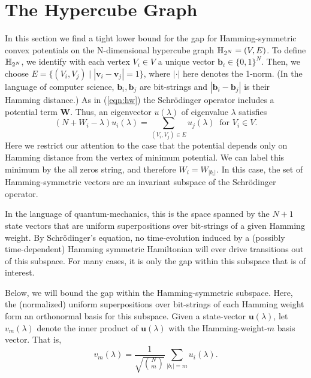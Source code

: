     \section{The Hypercube Graph}
    In this section we find a tight lower bound for the gap for Hamming-symmetric convex potentials on the N-dimensional hypercube graph $\mathbb{H}_{2^N} = (V,E)$. To define $\mathbb{H}_{2^N}$, we identify with each vertex $V_i \in V$ a unique vector $\mathbf{b}_i \in \{0,1\}^N$. Then, we choose $E = \{(V_i,V_j)\; \big\rvert \;|\mathbf{v}_i-\mathbf{v}_j| = 1 \}$, where $|\cdot|$ here denotes the 1-norm. (In the language of computer science, $\mathbf{b}_i, \mathbf{b}_j$ are bit-strings and $|\mathbf{b}_i - \mathbf{b}_j|$ is their Hamming distance.) As in (\ref{eqn:hw}) the Schr\"{o}dinger operator includes a potential term $\mathbf{W}$. Thus, an eigenvector $u(\lambda)$ of eigenvalue $\lambda$ satisfies
    \begin{equation}\label{eqn:recurrence_hyper_prior}
    	(N + W_i - \lambda)u_i(\lambda) = \sum_{(V_i,V_j)\in E} u_j(\lambda) \;\; \text{for $V_i \in V$.}
    \end{equation}
    Here we restrict our attention to the case that the potential depends only on Hamming distance from the vertex of minimum potential. We can label this minimum by the all zeros string, and therefore $W_i = W_{|b_i|}$. In this case, the set of Hamming-symmetric vectors are an invariant subspace of the Schr\"{o}dinger operator.
    \begin{remark}
    In the language of quantum-mechanics, this is the space spanned by the $N+1$ state vectors that are uniform superpositions over bit-strings of a given Hamming weight. By Schr{\"o}dinger's equation, no time-evolution induced by a (possibly time-dependent) Hamming symmetric Hamiltonian will ever drive transitions out of this subspace. For many cases, it is only the gap within this subspace that is of interest.
    \end{remark}
    Below, we will bound the gap within the Hamming-symmetric subspace. Here, the (normalized) uniform superpositions over bit-strings of each Hamming weight form an orthonormal basis for this subspace.    Given a state-vector $\mathbf{u}(\lambda)$, let $v_m(\lambda)$ denote the inner product of $\mathbf{u}(\lambda)$ with the Hamming-weight-$m$ basis vector. That is,
    \begin{equation}
    	v_m(\lambda) = \frac{1}{\sqrt{\binom{N}{m}}} \sum_{|b_i|=m} u_i(\lambda).
    \end{equation}

